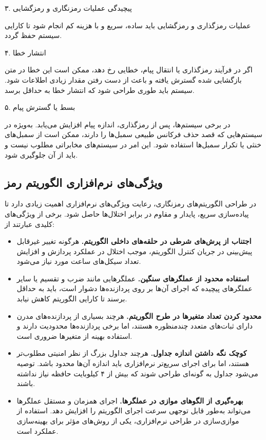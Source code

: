 ۳. پیچیدگی عملیات رمزنگاری و رمزگشایی

عملیات رمزگذاری و رمزگشایی باید ساده، سریع و با هزینه کم انجام شود تا کارایی سیستم حفظ گردد.

۴. انتشار خطا

اگر در فرآیند رمزگذاری یا انتقال پیام، خطایی رخ دهد، ممکن است این خطا در متن بازگشایی شده گسترش یافته و باعث از دست رفتن مقدار زیادی اطلاعات شود. سیستم باید طوری طراحی شود که انتشار خطا به حداقل برسد.

۵. بسط یا گسترش پیام

در برخی سیستم‌ها، پس از رمزگذاری، اندازه پیام افزایش می‌یابد. به‌ویژه در سیستم‌هایی که قصد حذف فرکانس طبیعی سمبل‌ها را دارند، ممکن است از سمبل‌های خنثی یا تکرار سمبل‌ها استفاده شود. این امر در سیستم‌های مخابراتی مطلوب نیست و باید از آن جلوگیری شود.

\subsection{ویژگی‌های نرم‌افزاری الگوریتم رمز}

در طراحی الگوریتم‌های رمزنگاری، رعایت ویژگی‌های نرم‌افزاری اهمیت زیادی دارد تا پیاده‌سازی سریع، پایدار و مقاوم در برابر اختلال‌ها حاصل شود. برخی از ویژگی‌های کلیدی عبارتند از\cite{ref38}:

\begin{itemize}
    \item \textbf{اجتناب از پرش‌های شرطی در حلقه‌های داخلی الگوریتم.} هرگونه تغییر غیرقابل پیش‌بینی در جریان کنترل الگوریتم، موجب اختلال در عملکرد پردازش و افزایش تعداد سیکل‌های ساعت مورد نیاز می‌شود.
    \item \textbf{استفاده محدود از عملگرهای سنگین.} عملگرهایی مانند ضرب و تقسیم یا سایر عملگرهای پیچیده که اجرای آن‌ها بر روی پردازنده‌ها دشوار است، باید به حداقل برسند تا کارایی الگوریتم کاهش نیابد.
    \item \textbf{محدود کردن تعداد متغیرها در طرح الگوریتم.} هرچند بسیاری از پردازنده‌های مدرن دارای ثبات‌های متعدد چندمنظوره هستند، اما برخی پردازنده‌ها محدودیت دارند و استفاده بهینه از متغیرها ضروری است.
    \item \textbf{کوچک نگه داشتن اندازه جداول.} هرچند جداول بزرگ از نظر امنیتی مطلوب‌تر هستند، اما برای اجرای سریع‌تر نرم‌افزاری باید اندازه آن‌ها محدود باشد. توصیه می‌شود جداول به گونه‌ای طراحی شوند که بیش از ۴ کیلوبایت حافظه نیاز نداشته باشند.
    \item \textbf{بهره‌گیری از الگوهای موازی در عملگرها.} اجرای همزمان و مستقل عملگرها می‌تواند به‌طور قابل توجهی سرعت اجرای الگوریتم را افزایش دهد. استفاده از موازی‌سازی در طراحی نرم‌افزاری، یکی از روش‌های مؤثر برای بهینه‌سازی عملکرد است.
\end{itemize}

